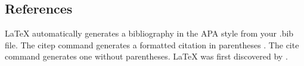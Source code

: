 \documentclass[a4paper,man,natbib,floatsintext]{apa6}
\begin{document}
%

\subsection{References}

LaTeX automatically generates a bibliography in the APA style from your .bib file. The citep command generates a formatted citation in parentheses \citep{Lamport1986}. The cite command generates one without parentheses. LaTeX was first discovered by \cite{Lamport1986}.






\end{document}
